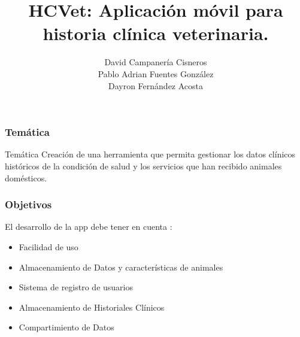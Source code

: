 \documentclass[14pt]{beamer}
\author[Campanería, Fernández, Fuentes]
{David Campanería Cisneros\\Pablo Adrian Fuentes González\\Dayron Fernández Acosta}
\title[Aplicación   HCVet]
{HCVet: Aplicación móvil para historia clínica veterinaria.}
\institute[UH]
{\textbf{Tutores:}\\ José Alejandro Mesejo Chiong\\ José Luis Castañeda Lorenzo}
\begin{document}
\begin{frame}
\titlepage
\end{frame}



\begin{frame}
\frametitle{Temática}
\begin{block}{Temática}
Creación de una herramienta que permita gestionar los datos clínicos históricos de la condición de salud y los servicios que han recibido animales domésticos.

\end{block}

\end{frame}


\begin{frame}
\frametitle{Objetivos}
El desarrollo de la app debe tener en cuenta :
\begin{itemize}
\item Facilidad de uso
\item Almacenamiento de Datos y características de animales
\item Sistema de registro de usuarios
\item Almacenamiento de Historiales Clínicos
\item Compartimiento de Datos 


\end{itemize}

\end{frame}
\end{document}
